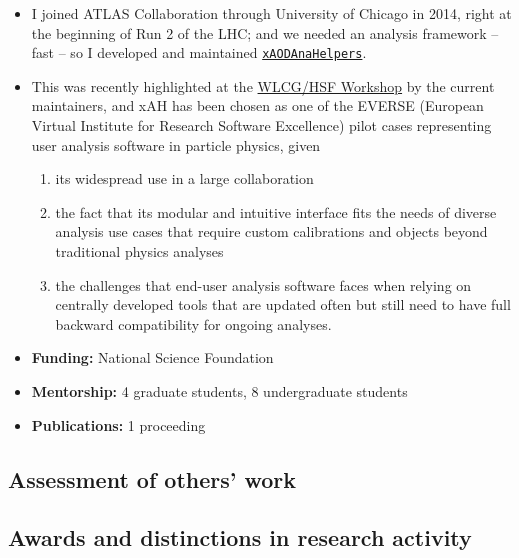 \begin{itemize}
	\setlength{\itemsep}{0em}
	\item I joined ATLAS Collaboration through University of Chicago in 2014, right at the beginning of Run 2 of the LHC; and we needed an analysis framework -- fast -- so I developed and maintained \href{https://ucatlas.github.io/xAODAnaHelpers/}{\texttt{xAODAnaHelpers}}.
	\item This was recently highlighted at the \href{https://indico.cern.ch/event/1369601/contributions/5883628/}{WLCG/HSF Workshop} by the current maintainers, and xAH has been chosen as one of the EVERSE (European Virtual Institute for Research Software Excellence) pilot cases representing user analysis software in particle physics, given
	      \begin{enumerate}[label=\alph*]
		      \item its widespread use in a large collaboration
		      \item the fact that its modular and intuitive interface fits the needs of diverse analysis use cases that require custom calibrations and objects beyond traditional physics analyses
		      \item the challenges that end-user analysis software faces when relying on centrally developed tools that are updated often but still need to have full backward compatibility for ongoing analyses.
	      \end{enumerate}
	\item \textbf{Funding:} National Science Foundation
	\item \textbf{Mentorship:} 4 graduate students, 8 undergraduate students
	\item \textbf{Publications:} 1 proceeding 
\end{itemize}

\subsection{Assessment of others’ work \noneyet}\label{ssec:assessment-of-others-work-noneyet}
\subsection{Awards and distinctions in research activity}\label{ssec:awards-and-distinctions-in-research-activity}


